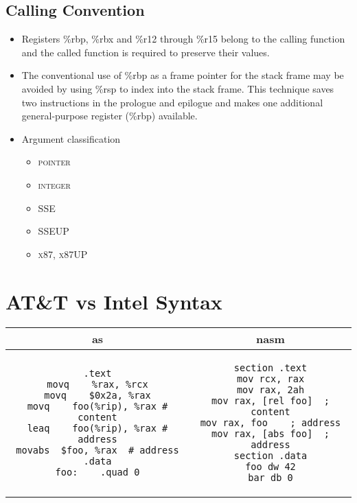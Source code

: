 \documentclass[a4paper,12pt]{article}
\begin{document}
\subsection{Calling Convention}
\begin{itemize}
\item Registers \%rbp, \%rbx and \%r12 through \%r15 belong to the calling function and the called function is required to preserve their values.
\item The conventional use of \%rbp as a frame pointer for the stack frame may be avoided by using \%rsp to index into the stack frame. This technique saves two instructions in the prologue and epilogue and makes one additional general-purpose register (\%rbp) available.
\item Argument classification
\begin{itemize}
\item \textsc{pointer}
\item \textsc{integer}
\item \textsc{SSE}
\item \textsc{SSEUP}
\item \textsc{x87, x87UP}
\end{itemize}
\end{itemize}

\section{AT\&T vs Intel Syntax}
\begin{tabular}{|c|c|}
\hline
\lstset{language=[x86masm]Assembler}
as & nasm
\\
\hline
\begin{lstlisting}
.text
movq	%rax, %rcx
movq	$0x2a, %rax
movq	foo(%rip), %rax	# content
leaq	foo(%rip), %rax	# address
movabs	$foo, %rax 	# address
.data
foo:	.quad 0
\end{lstlisting}
&
\begin{lstlisting}
section .text
mov	rcx, rax
mov	rax, 2ah
mov	rax, [rel foo]	; content
mov	rax, foo 	; address
mov	rax, [abs foo]	; address
section .data
foo	dw 42
bar	db 0
\end{lstlisting}
\\
\hline
\end{tabular}

\newpage
\end{document}
